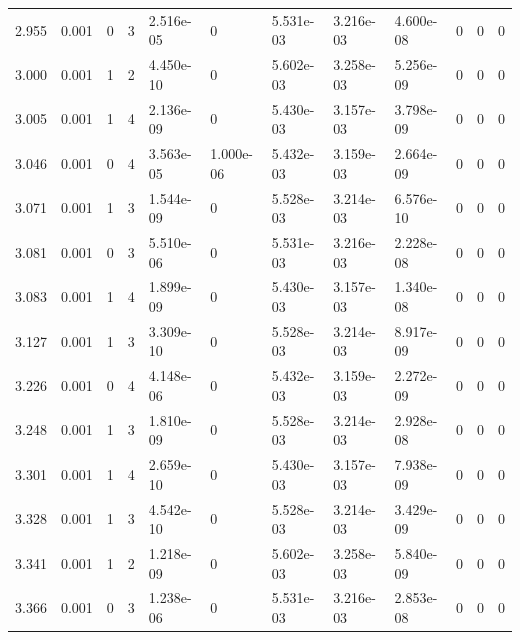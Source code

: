 \documentclass[preview]{standalone}
\begin{document}
{{{\begin{tabular}{L{1.2cm}C{1.2cm} C{0.3cm}C{0.5cm} C{1.4cm}C{1.4cm} C{1.4cm}C{1.4cm} C{1.6cm}C{1.6cm} C{1.6cm}C{1.6cm}}
  2.955  &  0.001  & 0     &  3 &  2.516e-05  & 0  &  5.531e-03&   3.216e-03& 4.600e-08 & 0   &  0 & 0  \\ 
  3.000  &  0.001  & 1     &  2 &  4.450e-10  & 0  &  5.602e-03&   3.258e-03& 5.256e-09 & 0   &  0 & 0  \\ 
  3.005  &  0.001  & 1     &  4 &  2.136e-09  & 0  &  5.430e-03&   3.157e-03& 3.798e-09 & 0   &  0 & 0  \\ 
  3.046  &  0.001  & 0     &  4 &  3.563e-05  & 1.000e-06  &  5.432e-03&   3.159e-03& 2.664e-09 & 0   &  0 & 0  \\ 
  3.071  &  0.001  & 1     &  3 &  1.544e-09  & 0  &  5.528e-03&   3.214e-03& 6.576e-10 & 0   &  0 & 0  \\ 
  3.081  &  0.001  & 0     &  3 &  5.510e-06  & 0  &  5.531e-03&   3.216e-03& 2.228e-08 & 0   &  0 & 0  \\ 
  3.083  &  0.001  & 1     &  4 &  1.899e-09  & 0  &  5.430e-03&   3.157e-03& 1.340e-08 & 0   &  0 & 0  \\ 
  3.127  &  0.001  & 1     &  3 &  3.309e-10  & 0  &  5.528e-03&   3.214e-03& 8.917e-09 & 0   &  0 & 0  \\ 
  3.226  &  0.001  & 0     &  4 &  4.148e-06  & 0  &  5.432e-03&   3.159e-03& 2.272e-09 & 0   &  0 & 0  \\ 
  3.248  &  0.001  & 1     &  3 &  1.810e-09  & 0  &  5.528e-03&   3.214e-03& 2.928e-08 & 0   &  0 & 0  \\ 
  3.301  &  0.001  & 1     &  4 &  2.659e-10  & 0  &  5.430e-03&   3.157e-03& 7.938e-09 & 0   &  0 & 0  \\ 
  3.328  &  0.001  & 1     &  3 &  4.542e-10  & 0  &  5.528e-03&   3.214e-03& 3.429e-09 & 0   &  0 & 0  \\ 
  3.341  &  0.001  & 1     &  2 &  1.218e-09  & 0  &  5.602e-03&   3.258e-03& 5.840e-09 & 0   &  0 & 0  \\ 
  3.366  &  0.001  & 0     &  3 &  1.238e-06  & 0  &  5.531e-03&   3.216e-03& 2.853e-08 & 0   &  0 & 0  \\ 
\hline 
\end{tabular} 

}}}
\end{document}

